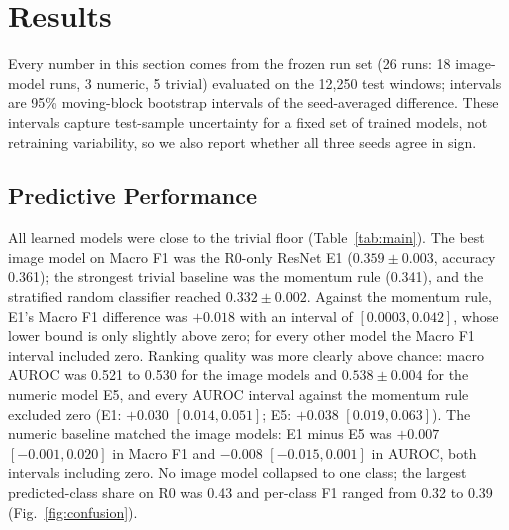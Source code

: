 \documentclass[10pt,journal,compsoc]{IEEEtran}
\newif\ifshowdraft
\newcommand{\draft}[1]{\ifshowdraft\textcolor{red}{[#1]}\fi}
\newcommand{\gen}[2]{\IfFileExists{generated/#1}{}{\draft{#2}}}
\begin{document}
\section{Results}\label{sec:results}
Every number in this section comes from the frozen run set (26 runs: 18 image-model runs, 3 numeric, 5 trivial) evaluated on the 12{,}250 test windows; intervals are 95\% moving-block bootstrap intervals of the seed-averaged difference. These intervals capture test-sample uncertainty for a fixed set of trained models, not retraining variability, so we also report whether all three seeds agree in sign.

\subsection{Predictive Performance}
\gen{tables/table1_main.tex}{Table 1: main results, generated}
All learned models were close to the trivial floor (Table~\ref{tab:main}). The best image model on Macro F1 was the R0-only ResNet E1 ($0.359 \pm 0.003$, accuracy 0.361); the strongest trivial baseline was the momentum rule (0.341), and the stratified random classifier reached $0.332 \pm 0.002$. Against the momentum rule, E1's Macro F1 difference was $+0.018$ with an interval of $[0.0003, 0.042]$, whose lower bound is only slightly above zero; for every other model the Macro F1 interval included zero. Ranking quality was more clearly above chance: macro AUROC was 0.521 to 0.530 for the image models and $0.538 \pm 0.004$ for the numeric model E5, and every AUROC interval against the momentum rule excluded zero (E1: $+0.030$ $[0.014, 0.051]$; E5: $+0.038$ $[0.019, 0.063]$). The numeric baseline matched the image models: E1 minus E5 was $+0.007$ $[-0.001, 0.020]$ in Macro F1 and $-0.008$ $[-0.015, 0.001]$ in AUROC, both intervals including zero. No image model collapsed to one class; the largest predicted-class share on R0 was 0.43 and per-class F1 ranged from 0.32 to 0.39 (Fig.~\ref{fig:confusion}).
\end{document}
